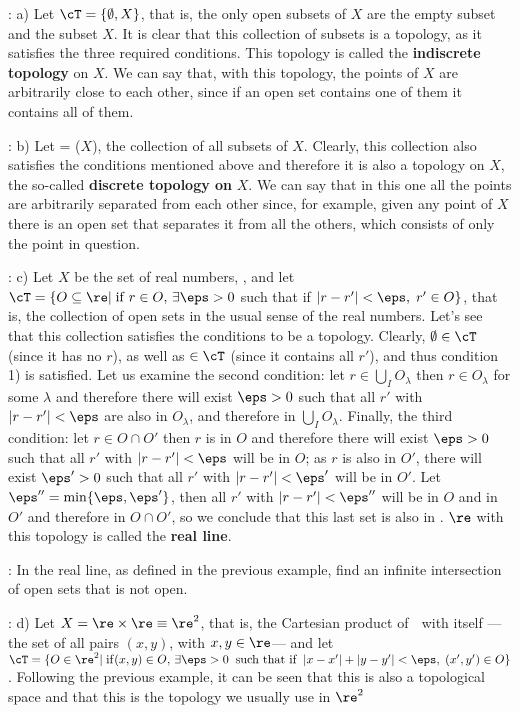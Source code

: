 \ejem: a) Let $\cT = \{\emptyset, X\}$, that is, the only open subsets of $X$ are the empty subset and the subset $X$. It is clear that this collection of subsets is a topology, as it satisfies the three required conditions. This topology is called the {\bf indiscrete topology} on $X$. We can say that, with this topology, the points of $X$ are arbitrarily close to each other, since if an open set contains one of them it contains all of them.

\ejem: b) Let \cT = \cP($X$), the collection of all subsets of $X$. Clearly, this collection also satisfies the conditions mentioned above and therefore it is also a topology on $X$, the so-called {\bf discrete topology on} $X$. We can say that in this one all the points are arbitrarily separated from each other since, for example, given any point of $X$ there is an open set that separates it from all the others, which consists of only the point in question.

\ejem: c) Let $X$ be the set of real numbers, \re, and let \\
$\cT = \{O \subseteq \re |\; \mathrm{if} \;r \in O, \, \exists \eps >0$ such that if $ |r - r'| < \eps, \; r' \in O\}$, that is, the collection of open sets in the usual sense of the real numbers. Let's see that this collection satisfies the conditions to be a topology. 
Clearly, $\emptyset \in \cT$ (since it has no $r$), as well as \re $ \in \cT$ (since it contains all $r'$), and thus condition 1) is satisfied. Let us examine the second condition: let $r \in \bigcup_I O_{\lambda}$ then $r \in O_{\lambda}$ for some $\lambda$ and therefore there will exist $\eps >0 $ such that all $r'$ with $|r-r'| < \eps $ are also in $O_{\lambda}$, and therefore in $\bigcup_I O_{\lambda}$. 
Finally, the third condition: let $r \in O \cap O'$ then $r$ is in $O$ and therefore there will exist $\eps > 0$ such that all $r'$ with $|r-r'| < \eps $ will be in $O$; as $r$ is also in $O'$, there will exist $\eps'> 0$ such that all $r'$ with $|r-r'| < \eps'$ will be in $O'$. 
Let $\eps'' = \mathrm{min}\{\eps, \eps' \}$, then all $r'$ with $|r-r'| < \eps''$ will be in $O$ and in $O'$ and therefore in $O \cap O'$, so we conclude that this last set is also in \cT. $\re$ with this topology is called the {\bf real line}.

\ejer: In the real line, as defined in the previous example, find an infinite intersection of open sets that is not open.

\ejem: d) Let $X = \re \times \re \equiv \re^2$, that is, the Cartesian product of \re $\;$ with itself ---the set of all pairs $(x,y)$, with $x,y \in \re$--- and let \\
$\cT = \{O \in \re^2 |\; \mathrm{if} (x,y) \in O, \, \exists \eps >0 \;\; \text{such that if}\;\; |x - x'|+|y-y'| < \eps, \; (x',y') \in O \}$. Following the previous example, it can be seen that this is also a topological space and that this is the topology we usually use in $\re^2$

